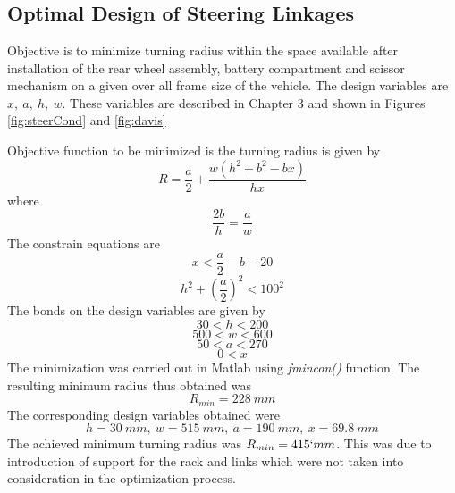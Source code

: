 \chapter{ }
\section{Optimal Design of Steering Linkages}
\label{Ch:ApenC}

Objective is to  minimize turning radius within the space available after installation  of the rear wheel assembly, battery compartment and scissor mechanism  on a given over all frame size of the vehicle. The design variables are $x,~ a, ~h, ~w$. These variables are described in Chapter 3 and shown in Figures \ref{fig:steerCond} and \ref{fig:davis}


Objective function to be minimized is the turning radius is given by
\begin{equation}
R=\dfrac{a}{2}+\dfrac{w(h^2+b^2-bx)}{hx}
\end{equation}
where
\[\dfrac{2b}{h}= \dfrac{a}{w}\]
The constrain equations are 
\[
x<\frac{a}{2}-b-20
\]
\[ h^2+\left(\dfrac{a}{2}\right)^2<100^2
\]
The bonds on the design variables are given by
\[30<h<200\]
\[500<w<600\]
\[50<a<270\]
\[0<x\]
The minimization was carried out in Matlab using \textit{fmincon()} function.
 The resulting minimum radius thus obtained was 
 \[R_{min}=228~mm\]
 The corresponding design variables obtained were 
 \[h=30~mm,~ w=515~mm, ~ a=190~mm, ~x=69.8~mm\] 
 The achieved minimum turning radius was $R_{min}=415`mm$. This was due to introduction of support for the rack and links which were not taken into consideration in the optimization process.
 